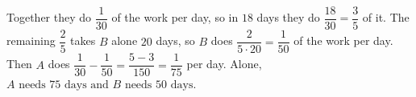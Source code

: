 Together they do $\dfrac{1}{30}$ of the work per day, so in $18$ days they do $\dfrac{18}{30}=\dfrac{3}{5}$ of it. The remaining $\dfrac{2}{5}$ takes $B$ alone $20$ days, so $B$ does $\dfrac{2}{5\cdot20}=\dfrac{1}{50}$ of the work per day. Then $A$ does $\dfrac{1}{30}-\dfrac{1}{50}=\dfrac{5-3}{150}=\dfrac{1}{75}$ per day. Alone, $\boxed{A\text{ needs }75\text{ days and }B\text{ needs }50\text{ days}}$.
